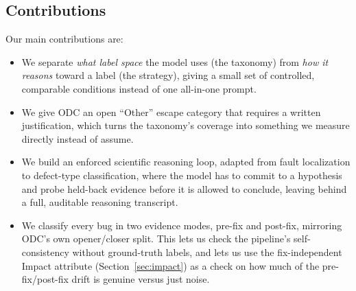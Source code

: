 \subsection{Contributions}
\label{sec:contributions}

Our main contributions are:
\begin{itemize}
  \item We separate \emph{what label space} the model uses (the taxonomy) from
        \emph{how it reasons} toward a label (the strategy), giving a small set
        of controlled, comparable conditions instead of one all-in-one prompt.
  \item We give ODC an open ``Other'' escape category that requires a written
        justification, which turns the taxonomy's coverage into something we
        measure directly instead of assume.
  \item We build an enforced scientific reasoning loop, adapted from fault
        localization to defect-type classification, where the model has to
        commit to a hypothesis and probe held-back evidence before it is
        allowed to conclude, leaving behind a full, auditable reasoning
        transcript.
  \item We classify every bug in two evidence modes, pre-fix and post-fix,
        mirroring ODC's own opener/closer split. This lets us check the
        pipeline's self-consistency without ground-truth labels, and lets us
        use the fix-independent Impact attribute (Section~\ref{sec:impact}) as
        a check on how much of the pre-fix/post-fix drift is genuine versus
        just noise.
\end{itemize}

